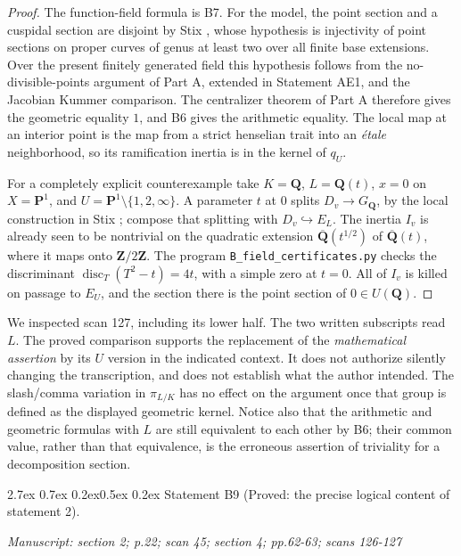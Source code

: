 \documentclass[11pt,a4paper]{article}
\makeatletter
\newcommand{\passage}[1]{\par\smallskip\noindent\textit{Manuscript: #1}\par\smallskip}
\renewcommand\paragraph{\@startsection{paragraph}{4}{\z@}%
  {2.7ex \@plus 0.7ex \@minus 0.2ex}{0.5ex \@plus 0.2ex}%
  {\normalfont\normalsize\bfseries}}
\makeatother
\begin{document}
\begin{proof}
The function-field formula is B7. For the model, the point section and a
cuspidal section are disjoint by Stix
\cite[Theorem 14(2)]{B_Stix2008}, whose hypothesis is injectivity of point
sections on proper curves of genus at least two over all finite base
extensions. Over the present finitely generated field this hypothesis follows from the
no-divisible-points argument of Part A, extended in Statement AE1, and the Jacobian Kummer
comparison. The centralizer theorem of Part A therefore gives the
geometric equality $1$, and B6 gives the arithmetic equality.
The local map at an interior point is the map from a strict henselian
trait into an \emph{\'etale} neighborhood, so its ramification inertia is
in the kernel of $q_U$.

For a completely explicit counterexample take $K=\mathbf Q$,
$L=\mathbf Q(t)$, $x=0$ on $X=\mathbf P^1$, and
$U=\mathbf P^1\setminus\{1,2,\infty\}$. A parameter $t$ at $0$ splits
$D_v\to G_{\mathbf Q}$, by the local construction in Stix
\cite[Proposition 8]{B_Stix2008}; compose that splitting with
$D_v\hookrightarrow E_L$. The inertia $I_v$ is already seen to be
nontrivial on the quadratic extension $\overline{\mathbf Q}(t^{1/2})$
of $\overline{\mathbf Q}(t)$, where it maps onto $\mathbf Z/2\mathbf Z$.
The program \texttt{B\_field\_certificates.py} checks the discriminant
$\operatorname{disc}_T(T^2-t)=4t$, with a simple zero at $t=0$.
All of $I_v$ is killed on passage to $E_U$, and the section there is the
point section of $0\in U(\mathbf Q)$.
\end{proof}

We inspected scan 127, including its lower half. The two written
subscripts read $L$. The proved comparison supports the replacement of
the \emph{mathematical assertion} by its $U$ version in the indicated
context. It does not authorize silently changing the transcription, and
does not establish what the author intended. The slash/comma variation
in $\pi_{L/K}$ has no effect on the argument once that group is defined
as the displayed geometric kernel. Notice also that the arithmetic and
geometric formulas with $L$ are still equivalent to each other by B6;
their common value, rather than that equivalence, is the erroneous
assertion of triviality for a decomposition section.

\paragraph{Statement B9 (Proved: the precise logical content of statement 2).}\label{res:B9}
\passage{section 2; p.22; scan 45; section 4; pp.62-63; scans 126-127}
\end{document}
